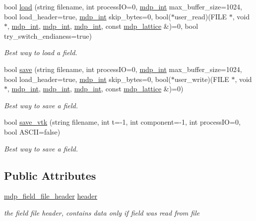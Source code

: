 \begin{DoxyCompactItemize}
\item 
bool \hyperlink{classmdp__field_a21ce8e89744a826abdc9f5325c714892}{load} (string filename, int processIO=0, \hyperlink{mdp__global__vars_8h_aaa1ad9d0dcd2124aa5af0120d9954174}{mdp\_\-int} max\_\-buffer\_\-size=1024, bool load\_\-header=true, \hyperlink{mdp__global__vars_8h_aaa1ad9d0dcd2124aa5af0120d9954174}{mdp\_\-int} skip\_\-bytes=0, bool($\ast$user\_\-read)(FILE $\ast$, void $\ast$, \hyperlink{mdp__global__vars_8h_aaa1ad9d0dcd2124aa5af0120d9954174}{mdp\_\-int}, \hyperlink{mdp__global__vars_8h_aaa1ad9d0dcd2124aa5af0120d9954174}{mdp\_\-int}, \hyperlink{mdp__global__vars_8h_aaa1ad9d0dcd2124aa5af0120d9954174}{mdp\_\-int}, const \hyperlink{classmdp__lattice}{mdp\_\-lattice} \&)=0, bool try\_\-switch\_\-endianess=true)
\begin{DoxyCompactList}\small\item\em Best way to load a field. \item\end{DoxyCompactList}\item 
bool \hyperlink{classmdp__field_a66bbe9d66cc3ad2a5955282df3519471}{save} (string filename, int processIO=0, \hyperlink{mdp__global__vars_8h_aaa1ad9d0dcd2124aa5af0120d9954174}{mdp\_\-int} max\_\-buffer\_\-size=1024, bool load\_\-header=true, \hyperlink{mdp__global__vars_8h_aaa1ad9d0dcd2124aa5af0120d9954174}{mdp\_\-int} skip\_\-bytes=0, bool($\ast$user\_\-write)(FILE $\ast$, void $\ast$, \hyperlink{mdp__global__vars_8h_aaa1ad9d0dcd2124aa5af0120d9954174}{mdp\_\-int}, \hyperlink{mdp__global__vars_8h_aaa1ad9d0dcd2124aa5af0120d9954174}{mdp\_\-int}, \hyperlink{mdp__global__vars_8h_aaa1ad9d0dcd2124aa5af0120d9954174}{mdp\_\-int}, const \hyperlink{classmdp__lattice}{mdp\_\-lattice} \&)=0)
\begin{DoxyCompactList}\small\item\em Best way to save a field. \item\end{DoxyCompactList}\item 
bool \hyperlink{classmdp__field_a8ad4d41e9c53df910f114031f84e0845}{save\_\-vtk} (string filename, int t=-\/1, int component=-\/1, int processIO=0, bool ASCII=false)
\begin{DoxyCompactList}\small\item\em Best way to save a field. \item\end{DoxyCompactList}\end{DoxyCompactItemize}
\subsection*{Public Attributes}
\begin{DoxyCompactItemize}
\item 
\hyperlink{classmdp__field__file__header}{mdp\_\-field\_\-file\_\-header} \hyperlink{classmdp__field_a465dfc6a95fe7ca5016595550cd024d9}{header}
\begin{DoxyCompactList}\small\item\em the field file header, contains data only if field was read from file \item\end{DoxyCompactList}\end{DoxyCompactItemize}
